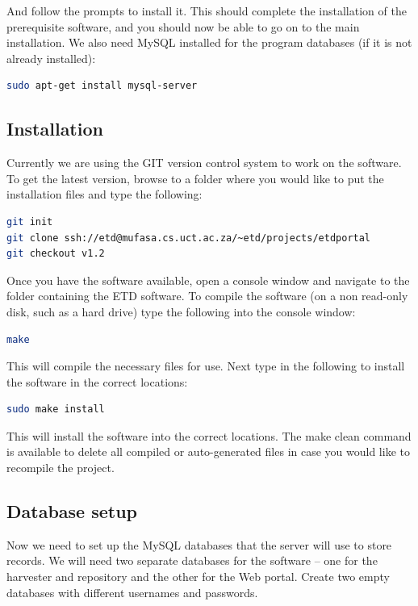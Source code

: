 \documentclass[a4paper,11pt]{article}
\begin{document}
And follow the prompts to install it. This should complete the installation of the prerequisite software, and you should now be able to go on to the main installation. We also need MySQL installed for the program databases (if it is not already installed): 

\begin{lstlisting}[language=bash]
 sudo apt-get install mysql-server
\end{lstlisting}

\subsection{Installation}

Currently we are using the GIT version control system to work on the software. To get the latest version, browse to a folder where you would like to put the installation files and type the following:

\begin{lstlisting}[language=bash]
git init 
git clone ssh://etd@mufasa.cs.uct.ac.za/~etd/projects/etdportal 
git checkout v1.2
\end{lstlisting}

Once you have the software available, open a console window and navigate to the folder containing the ETD software. To compile the software (on a non read-only disk, such as a hard drive) type the following into the console window: 

\begin{lstlisting}[language=bash]
 make
\end{lstlisting}

This will compile the necessary files for use. Next type in the following to install the software in the correct locations: 

\begin{lstlisting}[language=bash]
 sudo make install
\end{lstlisting}

This will install the software into the correct locations. The make clean command is available to delete all compiled or auto-generated files in case you would like to recompile the project.

\subsection{Database setup}

Now we need to set up the MySQL databases that the server will use to store records. We will need two separate databases for the software – one for the harvester and repository and the other for the Web portal. Create two empty databases with different usernames and passwords. 
\end{document}
